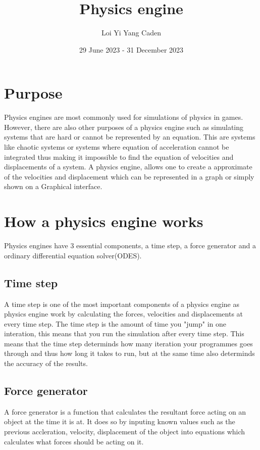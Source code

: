 \documentclass[12pt, a2paper]{article}
\title{Physics engine}
\author{Loi Yi Yang Caden}
\date{29 June 2023 - 31 December 2023}
\begin{document}
\maketitle
\pagebreak

\tableofcontents
\pagebreak

\section{Purpose}
Physics engines are most commonly used for simulations of physics in games. However, there are also other purposes of a physics engine such as simulating systems that are hard or cannot be represented by an equation. This are systems like chaotic systems or systems where equation of acceleration cannot be integrated thus making it impossible to find the equation of velocities and displacements of a system. A physics engine, allows one to create a approximate of the velocities and displacement which can be represented in a graph or simply shown on a Graphical interface.

\section{How a physics engine works}
Physics engines have 3 essential components, a time step, a force generator and a ordinary differential equation solver(ODES).

\subsection{Time step}
A time step is one of the most important components of a physics engine as physics engine work by calculating the forces, velocities and displacements at every time step. The time step is the amount of time you "jump" in one interation, this means that you run the simulation after every time step. This means that the time step determinds how many iteration your programmes goes through and thus how long it takes to run, but at the same time also determinds the accuracy of the results.

\subsection{Force generator}
A force generator is a function that calculates the resultant force acting on an object at the time it is at. It does so by inputing known values such as the previous accleration, velocity, displacement of the object into equations which calculates what forces should be acting on it. 
\end{document}

